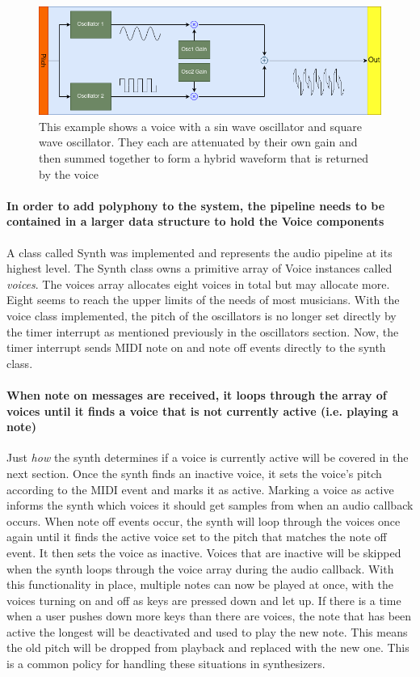 \documentclass[acmlarge,screen]{acmart}
\begin{document}
	\begin{figure}[H]
		\includegraphics[width=\linewidth]{simple_voice}
		\caption{This example shows a voice with a sin wave oscillator and square wave oscillator. They each are attenuated by their own gain and then summed together to form a hybrid waveform that is returned by the voice}
		\centering
	\end{figure}
	
	\paragraph{In order to add polyphony to the system, the pipeline needs to be contained in a larger data structure to hold the Voice components} A class called Synth was implemented and represents the audio pipeline at its highest level. The Synth class owns a primitive array of Voice instances called \textit{voices}. The voices array allocates eight voices in total but may allocate more. Eight seems to reach the upper limits of the needs of most musicians. With the voice class implemented, the pitch of the oscillators is no longer set directly by the timer interrupt as mentioned previously in the oscillators section. Now, the timer interrupt sends MIDI note on and note off events directly to the synth class. 
	
	\paragraph{When note on messages are received, it loops through the array of voices until it finds a voice that is not currently active (i.e. playing a note)} Just \textit{how} the synth determines if a voice is currently active will be covered in the next section. Once the synth finds an inactive voice, it sets the voice's pitch according to the MIDI event and marks it as active. Marking a voice as active informs the synth which voices it should get samples from when an audio callback occurs. When note off events occur, the synth will loop through the voices once again until it finds the active voice set to the pitch that matches the note off event. It then sets the voice as inactive. Voices that are inactive will be skipped when the synth loops through the voice array during the audio callback. With this functionality in place, multiple notes can now be played at once, with the voices turning on and off as keys are pressed down and let up. If there is a time when a user pushes down more keys than there are voices, the note that has been active the longest will be deactivated and used to play the new note. This means the old pitch will be dropped from playback and replaced with the new one. This is a common policy for handling these situations in synthesizers.
	
\end{document}
